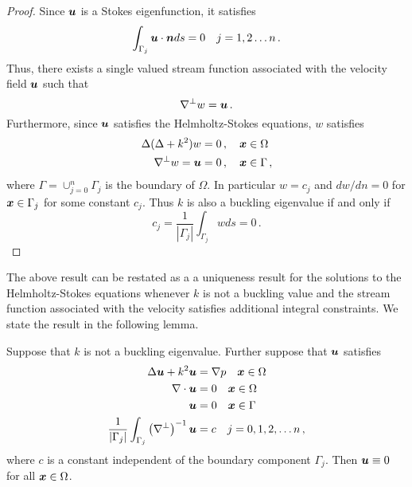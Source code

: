 \begin{proof}
Since ${\boldsymbol u}$ is a Stokes eigenfunction, it satisfies
\begin{equation}
\int_{\Gamma_{j}} {\boldsymbol u} \cdot {\boldsymbol n} ds = 0 \quad j=1,2\ldots n \, .
\end{equation}
Thus, there exists a single valued stream function associated with the
velocity field ${\boldsymbol u}$ such that 
\begin{equation}
\nabla^{\perp} w = {\boldsymbol u} \, .
\end{equation}
Furthermore, since ${\boldsymbol u}$ satisfies the Helmholtz-Stokes equations, 
$w$ satisfies
\begin{align}
\Delta (\Delta + k^{2} ) w &= 0 \, , \quad {\boldsymbol x} \in \Omega \\
\nabla^{\perp} w = {\boldsymbol u} &=0 \, ,\quad {\boldsymbol x} \in \Gamma \, ,
\end{align}
where $\Gamma = \cup_{j=0}^{n} \Gamma_{j}$ is the boundary of $\Omega$.
In particular $w= c_{j}$ and $dw/dn = 0$ for ${\boldsymbol x} \in \Gamma_{j}$ for
some constant $c_{j}$.
Thus $k$ is also a buckling eigenvalue if and only if 
\begin{equation}
c_{j} = \frac{1}{|\Gamma_{j}|}\int_{\Gamma_{j}} w ds =  0 \, .
\end{equation}
\end{proof}

The above result can be restated as a 
a uniqueness result for the 
solutions to the Helmholtz-Stokes equations whenever $k$ is
not a buckling value and the stream function associated with the
velocity satisfies additional integral constraints.
We state the result in the following lemma.
\begin{lem}
\label{lem:conshelmbieig}
Suppose that $k$ is not a buckling eigenvalue. 
Further suppose that ${\boldsymbol u}$ satisfies
\begin{align}
\Delta {\boldsymbol u} + k^{2} {\boldsymbol u} &= \nabla p \quad {\boldsymbol x} \in \Omega \\
\nabla \cdot {\boldsymbol u} &=0 \quad {\boldsymbol x} \in \Omega \\
{\boldsymbol u} &=0 \quad {\boldsymbol x} \in \Gamma \\
\frac{1}{|\Gamma_{j}|}
\int_{\Gamma_{j}} \left(\nabla^{\perp} \right)^{-1} {\boldsymbol u} &= c \quad
j=0,1,2,\ldots n\, ,
\end{align}
where $c$ is a constant independent of the boundary component $\Gamma_{j}$.
Then ${\boldsymbol u} \equiv 0$ for all ${\boldsymbol x} \in \Omega$.
\end{lem}

